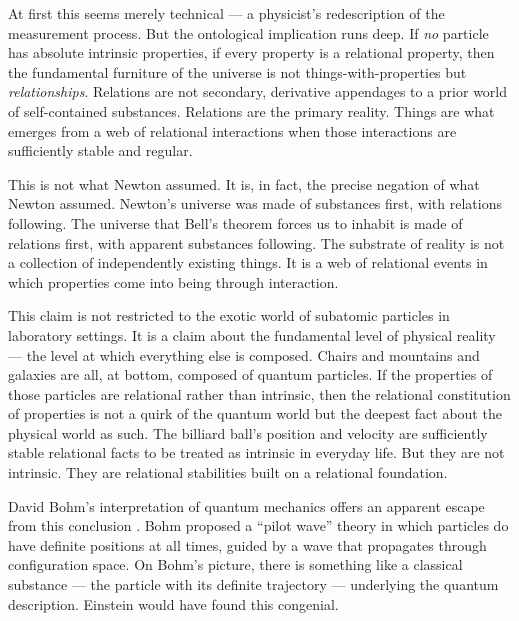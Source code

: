 At first this seems merely technical --- a physicist's redescription of the measurement process. But the ontological implication runs deep. If \emph{no} particle has absolute intrinsic properties, if every property is a relational property, then the fundamental furniture of the universe is not things-with-properties but \emph{relationships}. Relations are not secondary, derivative appendages to a prior world of self-contained substances. Relations are the primary reality. Things are what emerges from a web of relational interactions when those interactions are sufficiently stable and regular.

This is not what Newton assumed. It is, in fact, the precise negation of what Newton assumed. Newton's universe was made of substances first, with relations following. The universe that Bell's theorem forces us to inhabit is made of relations first, with apparent substances following. The substrate of reality is not a collection of independently existing things. It is a web of relational events in which properties come into being through interaction.

This claim is not restricted to the exotic world of subatomic particles in laboratory settings. It is a claim about the fundamental level of physical reality --- the level at which everything else is composed. Chairs and mountains and galaxies are all, at bottom, composed of quantum particles. If the properties of those particles are relational rather than intrinsic, then the relational constitution of properties is not a quirk of the quantum world but the deepest fact about the physical world as such. The billiard ball's position and velocity are sufficiently stable relational facts to be treated as intrinsic in everyday life. But they are not intrinsic. They are relational stabilities built on a relational foundation.

David Bohm's interpretation of quantum mechanics offers an apparent escape from this conclusion \citep{Bohm1980}. Bohm proposed a ``pilot wave'' theory in which particles do have definite positions at all times, guided by a wave that propagates through configuration space. On Bohm's picture, there is something like a classical substance --- the particle with its definite trajectory --- underlying the quantum description. Einstein would have found this congenial.

